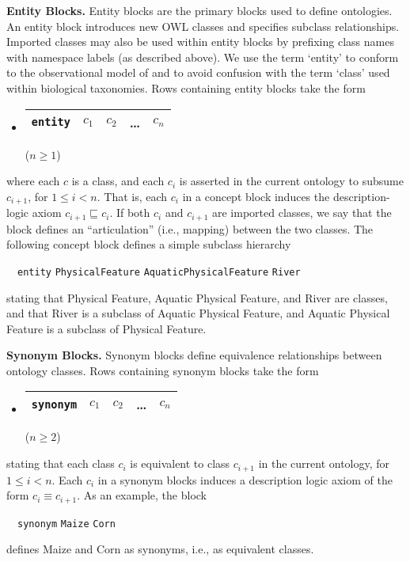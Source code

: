 \documentclass[preprint,number]{elsarticle}
\newcommand{\myblock}[1]{\vspace{12pt}\noindent\textbf{#1}}
\begin{document}
\myblock{Entity Blocks.} Entity blocks are the primary blocks used to
define ontologies. An entity block introduces new OWL classes and
specifies subclass relationships. Imported classes may also be used
within entity blocks by prefixing class names with namespace labels
(as described above).  We use the term `entity' to conform to the
observational model of \cite{bowers08:_concep_model_framew_for_expres}
and to avoid confusion with the term `class' used within biological
taxonomies. Rows containing entity blocks take the form
\begin{itemize}
\item[] 
  \begin{tabular}{|l|l|l|l|l|}\hline
    \texttt{entity} & $c_1$ & $c_2$ & \dots & $c_n$ \\ \hline 
  \end{tabular} \hfill ($n \ge 1$)
\end{itemize}
where each $c$ is a class, and each $c_i$ is asserted in the current
ontology to subsume $c_{i+1}$, for $1 \le i < n$. That is, each $c_i$
in a concept block induces the description-logic axiom $c_{i+1}
\sqsubseteq c_i$.  If both $c_i$ and $c_{i+1}$ are imported classes,
we say that the block defines an ``articulation'' (i.e., mapping)
between the two classes. The following concept block defines a simple
subclass hierarchy
\begin{tabbing}
  ~~\texttt{entity} \texttt{PhysicalFeature} 
    \texttt{AquaticPhysicalFeature} \texttt{River}
\end{tabbing}
stating that Physical Feature, Aquatic Physical Feature, and River are
classes, and that River is a subclass of Aquatic Physical Feature, and
Aquatic Physical Feature is a subclass of Physical Feature.


\myblock{Synonym Blocks.} Synonym blocks define equivalence
relationships between ontology classes.  Rows containing synonym
blocks take the form
\begin{itemize}
\item[] 
  \begin{tabular}{|l|l|l|l|l|}\hline
    \texttt{synonym} & $c_1$ & $c_2$ & \dots & $c_n$ \\ \hline 
  \end{tabular} \hfill ($n \ge 2$)
\end{itemize}
stating that each class $c_i$ is equivalent to class $c_{i+1}$ in the
current ontology, for $1 \le i < n$. Each $c_i$ in a synonym blocks
induces a description logic axiom of the form $c_i \equiv c_{i+1}$. As
an example, the block
\begin{tabbing}
  ~~\texttt{synonym} \texttt{Maize} \texttt{Corn}
\end{tabbing}
defines Maize and Corn as synonyms, i.e., as equivalent classes.
\end{document}
